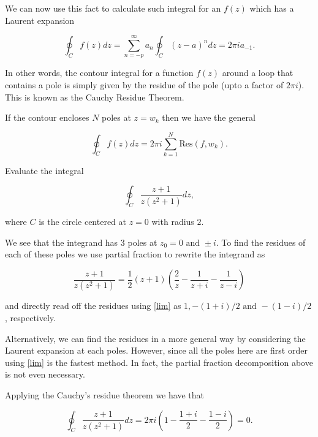 \documentclass[english,a4paper,12pt]{report}
\begin{document}
We can now use this fact to calculate such integral for an \(f(z)\) which has a Laurent expansion

\begin{equation}
    \oint_{C} f(z)dz = \sum_{n=-p}^{\infty} a_{n} \oint_{C} (z-a)^{n} dz = 2\pi i a_{-1}.
\end{equation}

In other words, the contour integral for a function \(f(z)\) around a loop that contains a pole is simply given by the residue of the pole (upto a factor of \(2\pi i\)). This is known as the Cauchy Residue Theorem.

If the contour encloses \(N\) poles at \(z = w_{k} \) then we have the general

\begin{equation}
    \oint_{C} f(z)dz = 2\pi i \sum_{k=1}^{N} \text{Res}(f,w_{k} ). 
\end{equation}

{Evaluate the integral 

\begin{equation}
    \oint_{C} \frac{z+1}{z(z^2+1)}dz,
\end{equation}

where \(C\) is the circle centered at \(z = 0\) with radius \(2\). 
}
{We see that the integrand has 3 poles at \(z_0 =0 \text { and } \pm i\). To find the residues of each of these poles we use partial fraction to rewrite the integrand as 

\begin{equation}
    \frac{z+1}{z(z^2+1)} = \frac{1}{2} (z+1)\left( \frac{2}{z} - \frac{1}{z+i} - \frac{1}{z-i}    \right)
\end{equation}

and directly read off the residues using \cref{lim} as \(1,-(1+i)/2 \text { and } -(1-i) /2\), respectively.

Alternatively, we can find the residues in a more general way by considering the Laurent expansion at each poles. However, since all the poles here are first order using \cref{lim} is the fastest method. In fact, the partial fraction decomposition above is not even necessary.

Applying the Cauchy's residue theorem we have that 

\begin{equation}
    \oint_{C} \frac{z+1}{z(z^2+1)}dz = 2\pi i\left( 1 - \frac{1+i}{2} - \frac{1-i}{2}   \right) = 0.
\end{equation}
~
}
\end{document}
